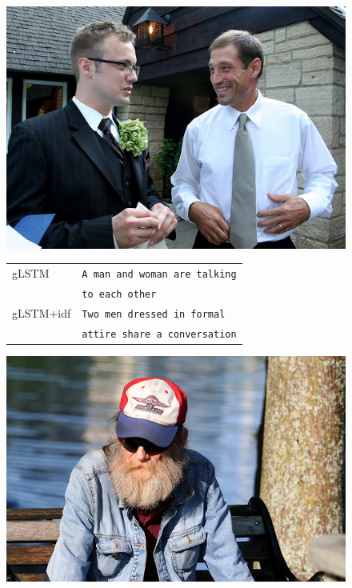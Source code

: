\documentclass[twoside,twocolumn]{article}
\begin{document}
\begin{figure}
	\centering
	\begin{minipage}[t]{.45\textwidth}
		\centering
		\vspace{0pt}
		\includegraphics[width=\textwidth]{Images/trouw}
	\end{minipage}\hfill	
	\begin{minipage}[t]{.7\textwidth}
		\vspace{0pt}
		\begin{tabular}{ll}
			gLSTM & \texttt{A man and woman are talking} \\ 
			~ & \texttt{to each other} \\
			gLSTM+idf & \texttt{Two men dressed in formal}\\
			~ & \texttt{attire share a conversation} \\
		\end{tabular}
	\end{minipage}
	\centering
	\begin{minipage}[t]{.45\textwidth}
		\centering
		\vspace{0pt}
		\includegraphics[width=\textwidth]{Images/441817653}

\end{minipage}
\end{figure}
\end{document}
